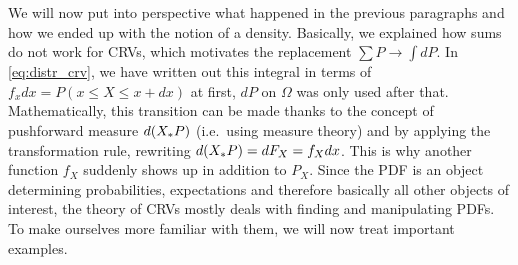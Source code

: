 We will now put into perspective what happened in the previous paragraphs and how we ended up with the notion of a density. Basically, we explained how sums do not work for CRVs, which motivates the replacement $\sum P \rightarrow \int dP$. In \eqref{eq:distr_crv}, we have written out this integral in terms of $f_x dx =  P(x \leq X \leq x + dx)$ at first, $dP$ on $\Omega$ was only used after that. Mathematically, this transition can be made thanks to the concept of pushforward measure $d\qty(X_* P)$ (i.e.~using measure theory) and by applying the transformation rule, rewriting $d\qty(X_* P) = dF_X = f_X dx$. This is why another function $f_X$ suddenly shows up in addition to $P_X$. Since the PDF is an object determining probabilities, expectations and therefore basically all other objects of interest, the theory of CRVs mostly deals with finding and manipulating PDFs. To make ourselves more familiar with them, we will now treat important examples. %


